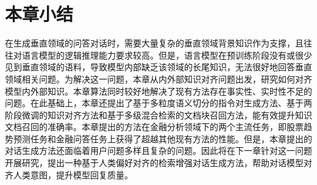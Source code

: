 \section{本章小结}

在生成垂直领域的问答对话时，需要大量复杂的垂直领域背景知识作为支撑，且往往对语言模型的逻辑推理能力要求较高。但是，语言模型在预训练阶段没有或很少见到垂直领域的语料，导致模型内部缺乏该领域的长尾知识，无法很好地回答垂直领域相关问题。为解决这一问题，本章从内外部知识对齐问题出发，研究如何对齐模型内外部知识。本章算法同时较好地解决了现有方法存在事实性、实时性不足的问题。在此基础上，本章还提出了基于多粒度语义切分的指令对生成方法、基于两阶段微调的知识对齐方法和基于多级混合检索的文档块召回方法，能有效提升知识文档召回的准确率。本章提出的方法在金融分析领域下的两个主流任务，即股票趋势预测任务和金融问答任务上获得了超越其他现有方法的性能。但是，本章提出的对话生成方法还面临着用户问题多样且复杂的问题。因此将在下一章针对这一问题开展研究，提出一种基于人类偏好对齐的检索增强对话生成方法，帮助对话模型对齐人类意图，提升模型回复质量。